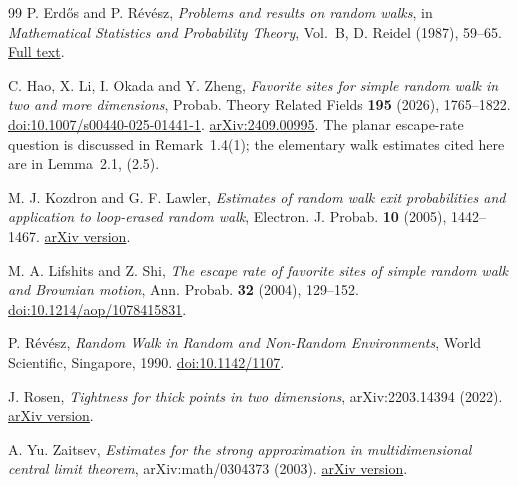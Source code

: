\documentclass[12pt,reqno]{amsart}
\theoremstyle{plain}
\theoremstyle{definition}
\theoremstyle{remark}
\numberwithin{equation}{section}
\begin{document}
\begin{thebibliography}{99}
P. Erd\H{o}s and P. R\'ev\'esz,
\emph{Problems and results on random walks},
in \emph{Mathematical Statistics and Probability Theory}, Vol.~B,
D. Reidel (1987), 59--65.
\href{https://renyi.hu/~p_erdos/1987-26.pdf}{Full text}.

C. Hao, X. Li, I. Okada and Y. Zheng,
\emph{Favorite sites for simple random walk in two and more dimensions},
Probab. Theory Related Fields \textbf{195} (2026), 1765--1822.
\href{https://doi.org/10.1007/s00440-025-01441-1}{doi:10.1007/s00440-025-01441-1}.
\href{https://arxiv.org/abs/2409.00995}{arXiv:2409.00995}.
The planar escape-rate question is discussed in Remark~1.4(1); the
elementary walk estimates cited here are in Lemma~2.1, (2.5).

M. J. Kozdron and G. F. Lawler,
\emph{Estimates of random walk exit probabilities and application to loop-erased
random walk},
Electron. J. Probab. \textbf{10} (2005), 1442--1467.
\href{https://arxiv.org/abs/math/0501189}{arXiv version}.

M. A. Lifshits and Z. Shi,
\emph{The escape rate of favorite sites of simple random walk and Brownian
motion},
Ann. Probab. \textbf{32} (2004), 129--152.
\href{https://doi.org/10.1214/aop/1078415831}{doi:10.1214/aop/1078415831}.

P. R\'ev\'esz,
\emph{Random Walk in Random and Non-Random Environments},
World Scientific, Singapore, 1990.
\href{https://doi.org/10.1142/1107}{doi:10.1142/1107}.

J. Rosen,
\emph{Tightness for thick points in two dimensions},
arXiv:2203.14394 (2022).
\href{https://arxiv.org/abs/2203.14394}{arXiv version}.

A. Yu. Zaitsev,
\emph{Estimates for the strong approximation in multidimensional central
limit theorem},
arXiv:math/0304373 (2003).
\href{https://arxiv.org/abs/math/0304373}{arXiv version}.

\end{thebibliography}
\end{document}

